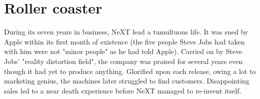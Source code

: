 \section{Roller coaster}
During its seven years in business, NeXT lead a tumultuous life. It was sued by Apple within its first month of existence (the five people Steve Jobs had taken with him were not "minor people" as he had told Apple). Carried on by Steve Jobs' "reality distortion field", the company was praised for several years even though it had yet to produce anything. Glorified upon each release, owing a lot to marketing genius, the machines later struggled to find customers. Disappointing sales led to a near death experience before NeXT managed to re-invent itself.\\
\par
\vspace{-5pt}
